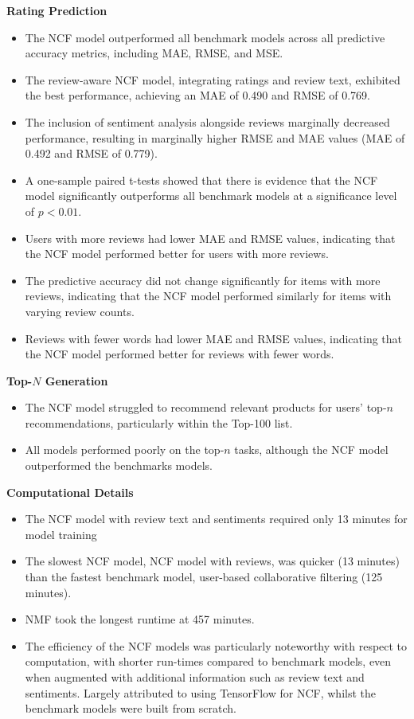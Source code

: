 \textbf{Rating Prediction}
\begin{itemize}
    \item The NCF model outperformed all benchmark models across all predictive accuracy metrics, including MAE, RMSE, and MSE.
    \item The review-aware NCF model, integrating ratings and review text, exhibited the best performance, achieving an MAE of 0.490 and RMSE of 0.769.
    \item The inclusion of sentiment analysis alongside reviews marginally decreased performance, resulting in marginally higher RMSE and MAE values (MAE of 0.492 and RMSE of 0.779).
    \item A one-sample paired t-tests showed that there is evidence that the NCF model significantly outperforms all benchmark models at a significance level of $p<0.01$.
    \item Users with more reviews had lower MAE and RMSE values, indicating that the NCF model performed better for users with more reviews.
    \item The predictive accuracy did not change significantly for items with more reviews, indicating that the NCF model performed similarly for items with varying review counts.
    \item  Reviews with fewer words had lower MAE and RMSE values, indicating that the NCF model performed better for reviews with fewer words.
    \end{itemize}
    

\textbf{Top-$N$ Generation}
\begin{itemize}
    \item The NCF model struggled to recommend relevant products for users' top-$n$ recommendations, particularly within the Top-100 list.
    \item All models performed poorly on the top-$n$ tasks, although the NCF model outperformed the benchmarks models.
\end{itemize}


\textbf{Computational Details}
\begin{itemize}
    \item The NCF model with review text and sentiments required only 13 minutes for model training
    \item The slowest NCF model, NCF model with reviews, was quicker (13 minutes) than the fastest benchmark model, user-based collaborative filtering (125 minutes).
    \item NMF took the longest runtime at 457 minutes.
    \item The efficiency of the NCF models was particularly noteworthy with respect to computation, with shorter run-times compared to benchmark models, even when augmented with additional information such as review text and sentiments. Largely attributed to using TensorFlow for NCF, whilst the benchmark models were built from scratch.
\end{itemize}


